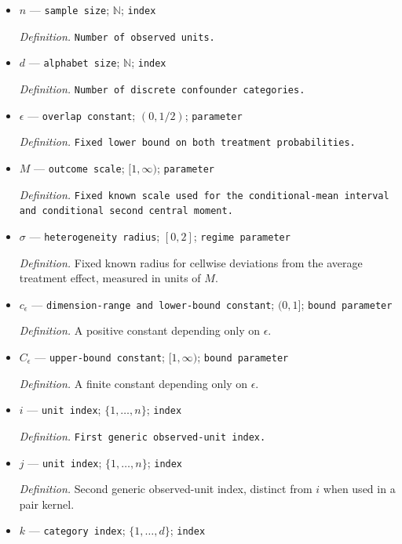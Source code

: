 \documentclass{article}
\begin{document}
\begin{itemize}
  \item \(n\) --- \texttt{sample size}; \(\mathbb N\); \texttt{index}
  \par\smallskip\noindent\emph{Definition.} \texttt{Number of observed units.}
  \item \(d\) --- \texttt{alphabet size}; \(\mathbb N\); \texttt{index}
  \par\smallskip\noindent\emph{Definition.} \texttt{Number of discrete confounder categories.}
  \item \(\epsilon\) --- \texttt{overlap constant}; \((0,1/2)\); \texttt{parameter}
  \par\smallskip\noindent\emph{Definition.} \texttt{Fixed lower bound on both treatment probabilities.}
  \item \(M\) --- \texttt{outcome scale}; \([1,\infty)\); \texttt{parameter}
  \par\smallskip\noindent\emph{Definition.} \texttt{Fixed known scale used for the conditional-\allowbreak{}mean interval and conditional second central moment.}
  \item \(\sigma\) --- \texttt{heterogeneity radius}; \([0,2]\); \texttt{regime parameter}
  \par\smallskip\noindent\emph{Definition.} Fixed known radius for cellwise deviations from the average treatment effect, measured in units of \(M\).
  \item \(c_{\epsilon}\) --- \texttt{dimension-\allowbreak{}range and lower-\allowbreak{}bound constant}; \((0,1]\); \texttt{bound parameter}
  \par\smallskip\noindent\emph{Definition.} A positive constant depending only on \(\epsilon\).
  \item \(C_{\epsilon}\) --- \texttt{upper-\allowbreak{}bound constant}; \([1,\infty)\); \texttt{bound parameter}
  \par\smallskip\noindent\emph{Definition.} A finite constant depending only on \(\epsilon\).
  \item \(i\) --- \texttt{unit index}; \(\{1,\ldots,n\}\); \texttt{index}
  \par\smallskip\noindent\emph{Definition.} \texttt{First generic observed-\allowbreak{}unit index.}
  \item \(j\) --- \texttt{unit index}; \(\{1,\ldots,n\}\); \texttt{index}
  \par\smallskip\noindent\emph{Definition.} Second generic observed-unit index, distinct from \(i\) when used in a pair kernel.
  \item \(k\) --- \texttt{category index}; \(\{1,\ldots,d\}\); \texttt{index}

\end{itemize}
\end{document}

